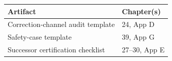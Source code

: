 
\begin{longtable}{@{}ll@{}}
\toprule
\textbf{Artifact} & \textbf{Chapter(s)} \\
\midrule
Correction-channel audit template & 24, App D \\
Safety-case template & 39, App G \\
Successor certification checklist & 27–30, App E \\
\bottomrule
\end{longtable}
